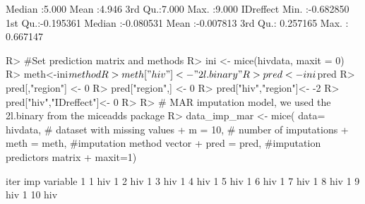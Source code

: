 \documentclass[
]{jss}
\begin{document}
\begin{CodeChunk}
\begin{CodeOutput}
                                                               Median :5.000  
                                                               Mean   :4.946  
                                                               3rd Qu.:7.000  
                                                               Max.   :9.000  
   IDreffect        
 Min.   :-0.682850  
 1st Qu.:-0.195361  
 Median :-0.080531  
 Mean   :-0.007813  
 3rd Qu.: 0.257165  
 Max.   : 0.667147  
\end{CodeOutput}
\begin{CodeInput}
R> #Set prediction matrix and methods
R> ini <- mice(hivdata, maxit = 0)
R> meth<-ini$method
R> meth["hiv"]<-"2l.binary"
R> pred <- ini$pred
R> pred[,"region"] <- 0
R> pred["region",] <- 0
R> pred["hiv","region"]<- -2
R> pred["hiv","IDreffect"]<- 0
R> 
R> # MAR imputation model, we used the 2l.binary from the miceadds package
R> data_imp_mar <- mice( data= hivdata, # dataset with missing values
+                       m = 10,   # number of imputations
+                       meth = meth, #imputation method vector
+                       pred = pred, #imputation predictors matrix
+                       maxit=1)
\end{CodeInput}
\begin{CodeOutput}

 iter imp variable
  1   1  hiv
  1   2  hiv
  1   3  hiv
  1   4  hiv
  1   5  hiv
  1   6  hiv
  1   7  hiv
  1   8  hiv
  1   9  hiv
  1   10  hiv
\end{CodeOutput}
\begin{CodeOutput}


\end{CodeOutput}
\end{CodeChunk}
\end{document}
